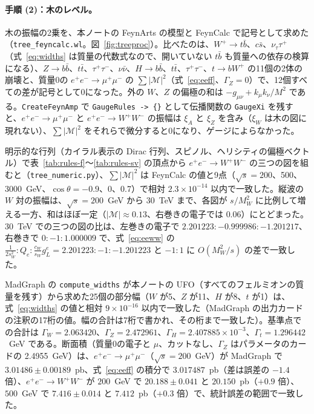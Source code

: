\documentclass[a4paper,10pt]{ltjsarticle}
\newcommand{\sw}{s_W}
\newcommand{\cw}{c_W}
\begin{document}
\paragraph{手順 (2)：木のレベル。}木の振幅の2乗を、本ノートの FeynArts の模型と FeynCalc で記号として求めた（\texttt{tree\_feyncalc.wl}。図~\ref{fig:treeproc}）。比べたのは、$W^+\to t\bar b$、$c\bar s$、$\nu_\tau\tau^+$（式~\eqref{eq:widths} は質量の代数式なので、開いていない $t\bar b$ も質量への依存の検算になる）、$Z\to b\bar b$、$t\bar t$、$\tau^+\tau^-$、$\nu\bar\nu$、$H\to b\bar b$、$t\bar t$、$\tau^+\tau^-$、$t\to bW^+$ の11個の2体の崩壊と、質量0の $e^+e^-\to\mu^+\mu^-$ の $\sum|\mathcal M|^2$（式~\eqref{eq:eeff}、$\Gamma_Z=0$）で、12個すべての差が記号として0になった。外の $W$、$Z$ の偏極の和は $-g_{\mu\nu}+k_\mu k_\nu/M^2$ である。\texttt{CreateFeynAmp} で \texttt{GaugeRules -> \{\}} として伝播関数の \texttt{GaugeXi} を残すと、$e^+e^-\to\mu^+\mu^-$ と $e^+e^-\to W^+W^-$ の振幅は $\xi_A$ と $\xi_Z$ を含み（$\xi_W$ は木の図に現れない）、$\sum|\mathcal M|^2$ をそれらで微分すると0になり、ゲージによらなかった。

明示的な行列（カイラル表示の Dirac 行列、スピノル、ヘリシティの偏極ベクトル）で表~\ref{tab:rules-f}〜\ref{tab:rules-sv} の頂点から $e^+e^-\to W^+W^-$ の三つの図を組むと（\texttt{tree\_numeric.py}）、$\sum|\mathcal M|^2$ は FeynCalc の値と9点（$\sqrt s=200$、500、3000~GeV、$\cos\theta=-0.9$、0、0.7）で相対 $2.3\times10^{-14}$ 以内で一致した。縦波の $W$ 対の振幅は、$\sqrt s=200$~GeV から 30~TeV まで、各図が $s/M_W^2$ に比例して増える一方、和はほぼ一定（$|\mathcal M|\approx0.13$、右巻きの電子では $0.06$）にとどまった。30~TeV での三つの図の比は、左巻きの電子で $2.201223:-0.999986:-1.201217$、右巻きで $0:-1:1.000009$ で、式~\eqref{eq:eeww} の $\frac1{2\sw^2}:Q_e:\frac{\cw}{\sw}g_L^e=2.201223:-1:-1.201223$ と $-1:1$ に $O(M_W^2/s)$ の差で一致した。

MadGraph の \texttt{compute\_widths} が本ノートの UFO（すべてのフェルミオンの質量を残す）から求めた25個の部分幅（$W$ が5、$Z$ が11、$H$ が8、$t$ が1）は、式~\eqref{eq:widths} の値と相対 $9\times10^{-16}$ 以内で一致した（MadGraph の出力カードの注釈の17桁の値。幅の合計は7桁で書かれ、その桁まで一致した）。基準点での合計は $\Gamma_W=2.063420$、$\Gamma_Z=2.472961$、$\Gamma_H=2.407885\times10^{-3}$、$\Gamma_t=1.296442$~GeV である。断面積（質量0の電子と $\mu$、カットなし、$\Gamma_Z$ はパラメータのカードの 2.4955~GeV）は、$e^+e^-\to\mu^+\mu^-$（$\sqrt s=200$~GeV）が MadGraph で $3.01486\pm0.00189$~pb、式~\eqref{eq:eeff} の積分で $3.017487$~pb（差は誤差の $-1.4$ 倍）、$e^+e^-\to W^+W^-$ が $200$~GeV で $20.188\pm0.041$ と $20.150$~pb（$+0.9$ 倍）、$500$~GeV で $7.416\pm0.014$ と $7.412$~pb（$+0.3$ 倍）で、統計誤差の範囲で一致した。
\end{document}
